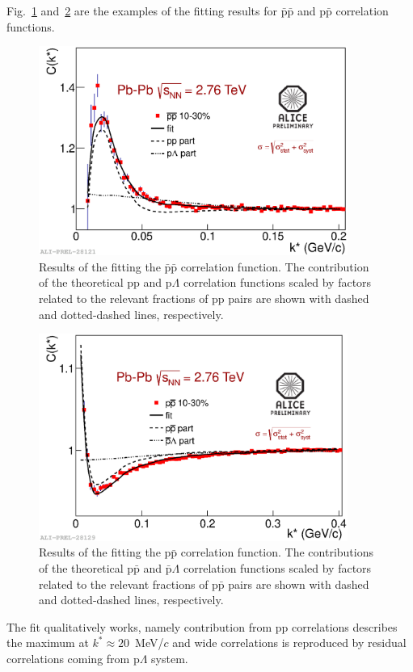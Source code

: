 Fig.~\ref{fitRC_apap_2_f1} and~\ref{fitRC_pap_2_f1} are the examples of the fitting results for $\bar{\mathrm{p}}\bar{\mathrm{p}}$ and p$\bar{\mathrm{p}}$ correlation functions.
\begin{figure}
  \centering
  \includegraphics[width=0.9\textwidth]{2012-Jul-25-fitRC_apap_2}
  \caption{Results of the fitting the $\bar{\mathrm{p}}\bar{\mathrm{p}}$ correlation function. The contribution of the theoretical pp and p$\Lambda$ correlation functions scaled by factors related to the relevant fractions of pp pairs are shown with dashed and dotted-dashed lines, respectively.}
  \label{fitRC_apap_2_f1}
\end{figure}
\begin{figure}
  \centering
  \includegraphics[width=0.9\textwidth]{2012-Jul-25-fitRC_pap_2}
  \caption{Results of the fitting the p$\bar{\mathrm{p}}$ correlation function. The contributions of the theoretical p$\bar{\mathrm{p}}$ and $\bar{\mathrm{p}}\Lambda$ correlation functions scaled by factors related to the relevant fractions of p$\bar{\mathrm{p}}$ pairs are shown with dashed and dotted-dashed lines, respectively.}
  \label{fitRC_pap_2_f1}
\end{figure}
The fit qualitatively works, namely contribution from pp correlations describes the maximum at $k^* \approx 20$~MeV/$c$ and wide correlations is reproduced by residual correlations coming from p$\Lambda$ system.


